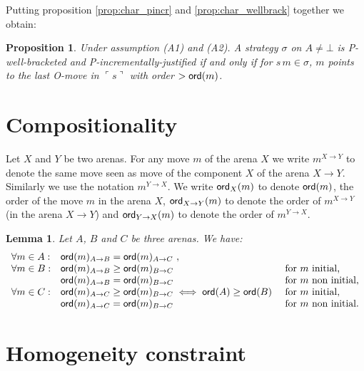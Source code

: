 \documentclass{article}
\newcommand{\pview}[1]{\ulcorner #1 \urcorner}
\newcommand{\ord}[1]{{\sf ord}(#1)}
\newcommand{\ordx}[2]{{\sf ord}_{#1}(#2)}
\newtheorem{lemma}{Lemma}[section]
\newtheorem{proposition}{Proposition}[section]
\theoremstyle{remark}
\theoremstyle{definition}
\begin{document}
Putting proposition \ref{prop:char_pincr} and
\ref{prop:char_wellbrack} together we obtain:
\begin{proposition}
Under assumption (A1) and (A2).
A strategy $\sigma$ on $A\neq \bot$
is \emph{P-well-bracketed} and
 \emph{P-incrementally-justified} if and only if
for $s \, m \in \sigma$, $m$ points to the last O-move in $\pview{s}$ with order $>\ord{m}$.
\end{proposition}

\section{Compositionality}


Let $X$ and $Y$ be two arenas.
For any move $m$ of the arena $X$ we write $m^{X\rightarrow Y}$ to denote the same move seen as move of the component $X$ of the arena $X\rightarrow Y$.
Similarly we use the notation $m^{Y\rightarrow X}$.
We write $\ordx{X}{m}$ to denote $\ord{m}$, the order of the move $m$ in the arena $X$, $\ordx{X\rightarrow Y}{m}$ to denote the order of $m^{X\rightarrow Y}$ (in the arena $X\rightarrow Y$) and $\ordx{Y\rightarrow X}{m}$ to denote the order of $m^{Y\rightarrow X}$.

\begin{lemma}
Let $A$, $B$ and $C$ be three arenas. We have:
$$\begin{array}{lll}
\forall m \in A:
	&  \ord{m}_{A\rightarrow B} = \ord{m}_{A\rightarrow C} \ ,\\
\forall m \in B:
	& \ord{m}_{A\rightarrow B} \geq \ord{m}_{B\rightarrow C}  & \mbox{for $m$ initial,}\\
	& \ord{m}_{A\rightarrow B} = \ord{m}_{B\rightarrow C} & \mbox{for $m$ non initial,} \\
\forall m \in C:
	& \ord{m}_{A\rightarrow C} \geq \ord{m}_{B\rightarrow C} \iff
\ord{A} \geq \ord{B}\ & \mbox{for $m$ initial,}\\
	& \ord{m}_{A\rightarrow C} = \ord{m}_{B\rightarrow C} 	& \mbox{for $m$ non initial.}
\end{array}
$$
\end{lemma}





\section{Homogeneity constraint}
\end{document}
